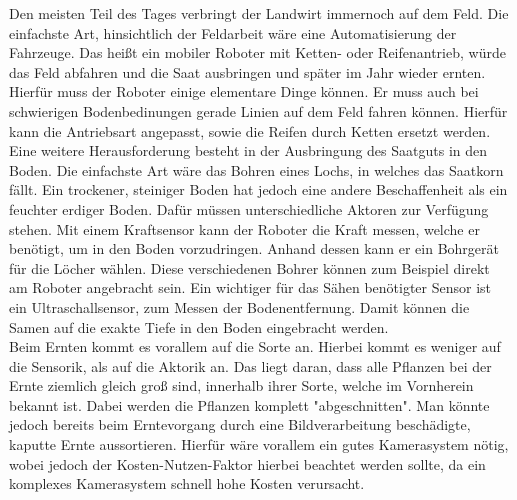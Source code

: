 Den meisten Teil des Tages verbringt der Landwirt immernoch auf dem Feld. Die
einfachste Art, hinsichtlich der Feldarbeit wäre eine Automatisierung der
Fahrzeuge. Das heißt ein mobiler Roboter mit Ketten- oder Reifenantrieb, würde
das Feld abfahren und die Saat ausbringen und später im Jahr wieder ernten. \\
Hierfür muss der Roboter einige elementare Dinge können. Er muss auch bei
schwierigen Bodenbedinungen gerade Linien auf dem Feld fahren können. Hierfür
kann die Antriebsart angepasst, sowie die Reifen durch Ketten ersetzt werden. Eine
weitere Herausforderung besteht in der Ausbringung des Saatguts in den Boden.
Die einfachste Art wäre das Bohren eines Lochs, in welches das Saatkorn fällt.
Ein trockener, steiniger Boden hat jedoch eine andere Beschaffenheit als
ein feuchter erdiger Boden. Dafür müssen unterschiedliche Aktoren zur Verfügung
stehen. Mit einem Kraftsensor kann der Roboter die Kraft messen, welche er
benötigt, um in den Boden vorzudringen. Anhand dessen kann er ein Bohrgerät für
die Löcher wählen. Diese verschiedenen Bohrer können zum Beispiel direkt am
Roboter angebracht sein.\cite{naik2016precision} Ein wichtiger für das Sähen benötigter Sensor ist ein
Ultraschallsensor, zum Messen der Bodenentfernung. Damit können die Samen auf
die exakte Tiefe in den Boden eingebracht werden.\\ Beim Ernten kommt es
vorallem auf die Sorte an. Hierbei kommt es weniger auf die Sensorik, als auf
die Aktorik an. Das liegt daran, dass alle Pflanzen bei der Ernte ziemlich
gleich groß sind, innerhalb ihrer Sorte, welche im Vornherein bekannt ist.
Dabei werden die Pflanzen komplett "abgeschnitten". Man könnte jedoch bereits
beim Erntevorgang durch eine Bildverarbeitung beschädigte, kaputte Ernte
aussortieren. Hierfür wäre vorallem ein gutes Kamerasystem nötig, wobei jedoch der Kosten-Nutzen-Faktor hierbei beachtet werden sollte, da ein komplexes Kamerasystem
schnell hohe Kosten verursacht.